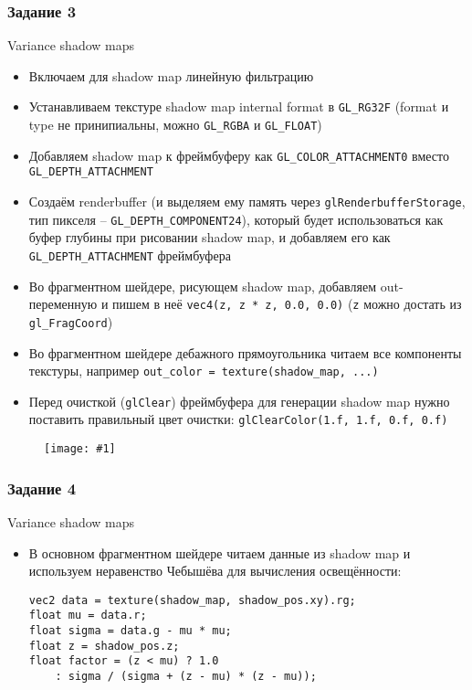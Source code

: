 \documentclass{beamer}
\newcommand{\slideimage}[1]{
  \begin{figure}
    \begin{adjustbox}{width=\textwidth, totalheight=\textheight-2\baselineskip-2\baselineskip,keepaspectratio}
      \texttt{[image: \#1]}
    \end{adjustbox}
  \end{figure}
}
\begin{document}
\begin{frame}[fragile]
\frametitle{Задание 3}
\fontsize{10pt}{10pt}
Variance shadow maps
\begin{itemize}
\item Включаем для shadow map линейную фильтрацию
\item Устанавливаем текстуре shadow map internal format в \verb|GL_RG32F| (format и type не принипиальны, можно \verb|GL_RGBA| и \verb|GL_FLOAT|)
\item Добавляем shadow map к фреймбуферу как \verb|GL_COLOR_ATTACHMENT0| вместо \verb|GL_DEPTH_ATTACHMENT|
\item Создаём renderbuffer (и выделяем ему память через \verb|glRenderbufferStorage|, тип пикселя -- \verb|GL_DEPTH_COMPONENT24|), который будет использоваться как буфер глубины при рисовании shadow map, и добавляем его как \verb|GL_DEPTH_ATTACHMENT| фреймбуфера
\item Во фрагментном шейдере, рисующем shadow map, добавляем out-переменную и пишем в неё \verb|vec4(z, z * z, 0.0, 0.0)| (\verb|z| можно достать из \verb|gl_FragCoord|)
\item Во фрагментном шейдере дебажного прямоугольника читаем все компоненты текстуры, например \verb|out_color = texture(shadow_map, ...)|
\item Перед очисткой (\verb|glClear|) фреймбуфера для генерации shadow map нужно поставить правильный цвет очистки: \verb|glClearColor(1.f, 1.f, 0.f, 0.f)|
\end{itemize}
\end{frame}

\begin{frame}[fragile]
\slideimage{3.png}
\end{frame}

\begin{frame}[fragile]
\frametitle{Задание 4}
\fontsize{10pt}{10pt}
Variance shadow maps
\begin{itemize}
\item В основном фрагментном шейдере читаем данные из shadow map и используем неравенство Чебышёва для вычисления освещённости:
\begin{verbatim}
vec2 data = texture(shadow_map, shadow_pos.xy).rg;
float mu = data.r;
float sigma = data.g - mu * mu;
float z = shadow_pos.z;
float factor = (z < mu) ? 1.0
    : sigma / (sigma + (z - mu) * (z - mu));
\end{verbatim}
\end{itemize}
\end{frame}
\end{document}
